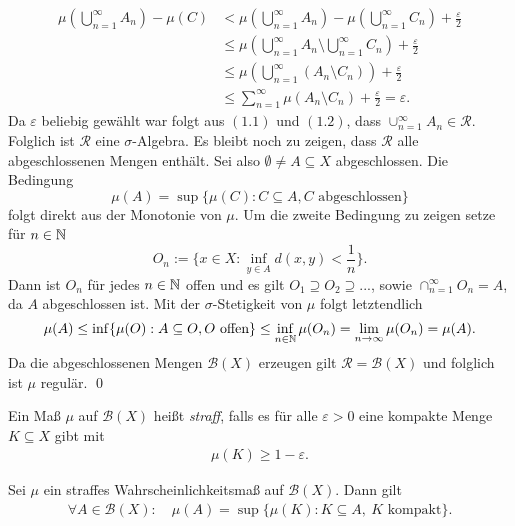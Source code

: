 \begin{proof*}
    \begin{align}
        \mu(\bigcup_{n=1}^{\infty}A_n) - \mu(C) &< \mu(\bigcup_{n=1}^{\infty}A_n) - \mu(\bigcup_{n=1}^{\infty}C_n) + \frac{\varepsilon}{2} \nonumber \\\
                                                &\leq \mu(\bigcup_{n=1}^{\infty}A_n \setminus \bigcup_{n=1}^{\infty}C_n)  + \frac{\varepsilon}{2} \nonumber \\\
                                                &\leq \mu(\bigcup_{n=1}^{\infty}(A_n \setminus C_n)) + \frac{\varepsilon}{2} \nonumber \\\
                                                &\leq \sum_{n=1}^{\infty}\mu(A_n \setminus C_n) + \frac{\varepsilon}{2} = \varepsilon. 
    \end{align}
    Da $\varepsilon$ beliebig gewählt war folgt aus $(1.1)$ und $(1.2)$, dass $\cup_{n=1}^{\infty}A_n \in \mathcal{R}$. Folglich ist $\mathcal{R}$ eine $\sigma$-Algebra. 
    Es bleibt noch zu zeigen, dass $\mathcal{R}$ alle abgeschlossenen Mengen enthält. Sei also $\emptyset \neq A \subseteq X$ abgeschlossen. Die Bedingung 
    $$
        \mu(A) = \sup\{\mu(C): C \subseteq A, C\text{ abgeschlossen}\}
    $$
    folgt direkt aus der Monotonie von $\mu$. Um die zweite Bedingung zu zeigen setze für $n \in \mathbb{N}$
    $$
        O_n := \big\{x \in X: \inf_{y \in  A}d(x,y) < \frac{1}{n}\big\}.
    $$
    Dann ist $O_n$ für jedes $n \in \mathbb{N}$ offen und es gilt $O_1 \supseteq O_2 \supseteq ...$, sowie $\cap_{n=1}^{\infty}O_n = A$, da $A$ abgeschlossen ist. 
    Mit der $\sigma$-Stetigkeit von $\mu$ folgt letztendlich 
    $$
        \mu(A) \leq \inf\{\mu(O): A \subseteq O, O \text{ offen}\} \leq \inf_{n \in \mathbb{N}}\mu(O_n) = \lim_{n \to \infty}\mu(O_n) = \mu(A). 
    $$
    Da die abgeschlossenen Mengen $\mathcal{B}(X)$ erzeugen gilt $\mathcal{R} = \mathcal{B}(X)$ und folglich ist $\mu$ regulär. \qed
\end{proof*}
\begin{mydef}
    Ein Maß $\mu$ auf $\mathcal{B}(X)$ heißt \textit{straff}, falls es für alle $\varepsilon > 0$ eine kompakte Menge $K \subseteq X$ gibt mit 
    \begin{align*}
        \mu(K) \geq 1 - \varepsilon. 
    \end{align*}

\end{mydef}

\begin{corollary}
    Sei $\mu$ ein straffes Wahrscheinlichkeitsmaß auf $\mathcal{B}(X)$. Dann gilt
    \begin{align*}
        \forall A \in \mathcal{B}(X): \quad \mu(A) = \sup\{\mu(K): K \subseteq A,\ K \text{ kompakt}\}. 
    \end{align*}
\end{corollary}

